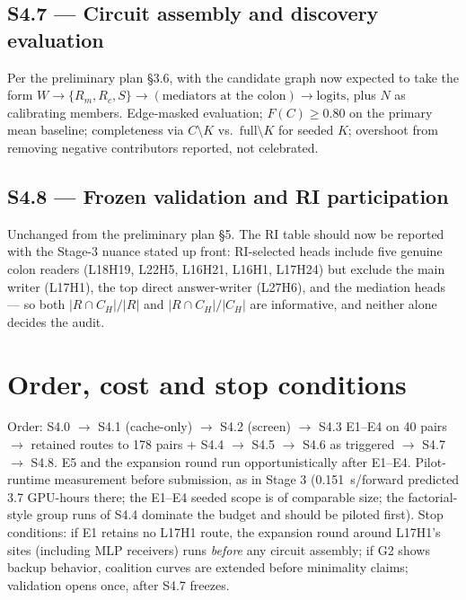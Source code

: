 \subsection{S4.7 --- Circuit assembly and discovery evaluation}
Per the preliminary plan \S3.6, with the candidate graph now expected to take the form
$W \to \{R_m, R_c, S\} \to (\text{mediators at the colon}) \to \text{logits}$, plus $N$
as calibrating members. Edge-masked evaluation; $F(C)\ge 0.80$ on the primary mean
baseline; completeness via $C\setminus K$ vs.\ $\mathrm{full}\setminus K$ for seeded
$K$; overshoot from removing negative contributors reported, not celebrated.

\subsection{S4.8 --- Frozen validation and RI participation}
\label{sec:val}
Unchanged from the preliminary plan \S5. The RI table should now be reported with the
Stage-3 nuance stated up front: RI-selected heads include five genuine colon readers
(L18H19, L22H5, L16H21, L16H1, L17H24) but exclude the main writer (L17H1), the top
direct answer-writer (L27H6), and the mediation heads --- so both
$|R\cap C_H|/|R|$ and $|R\cap C_H|/|C_H|$ are informative, and neither alone decides
the audit.

\section{Order, cost and stop conditions}

Order: S4.0 $\to$ S4.1 (cache-only) $\to$ S4.2 (screen) $\to$ S4.3 E1--E4 on 40 pairs
$\to$ retained routes to 178 pairs + S4.4 $\to$ S4.5 $\to$ S4.6 as triggered $\to$
S4.7 $\to$ S4.8. E5 and the expansion round run opportunistically after E1--E4.
Pilot-runtime measurement before submission, as in Stage 3 (0.151~s/forward
predicted 3.7 GPU-hours there; the E1--E4 seeded scope is of comparable size; the
factorial-style group runs of S4.4 dominate the budget and should be piloted first).
Stop conditions: if E1 retains no L17H1 route, the expansion round around L17H1's
sites (including MLP receivers) runs \emph{before} any circuit assembly; if G2 shows
backup behavior, coalition curves are extended before minimality claims; validation
opens once, after S4.7 freezes.


